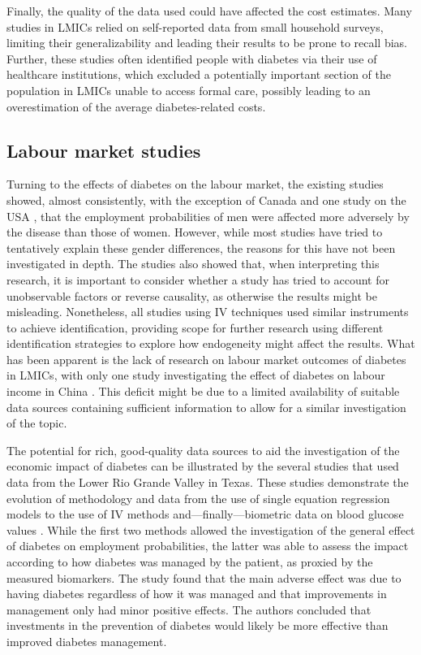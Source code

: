 Finally, the quality of the data used could have affected the cost estimates. Many studies in \acp{LMIC} relied on self-reported data from small household surveys, limiting their generalizability and leading their results to be prone to recall bias. Further, these studies often identified people with diabetes via their use of healthcare institutions, which excluded a potentially important section of the population in \acp{LMIC} unable to access formal care, possibly leading to an overestimation of the average diabetes-related costs. 

\subsection{Labour market studies}
Turning to the effects of diabetes on the labour market, the existing studies showed, almost consistently, with the exception of Canada \parencite{Latif2009} and one study on the USA \parencite{Minor2013}, that the employment probabilities of men were affected more adversely by the disease than those of women. However, while most studies have tried to tentatively explain these gender differences, the reasons for this have not been investigated in depth.  The studies also showed that, when interpreting this research, it is important to consider whether a study has tried to account for unobservable factors or reverse causality, as otherwise the results might be misleading. Nonetheless, all studies using \ac{IV} techniques used similar instruments to achieve identification, providing scope for further research using different identification strategies to explore how endogeneity might affect the results. What has been apparent is the lack of research on labour market outcomes of diabetes in \acp{LMIC}, with only one study investigating the effect of diabetes on labour income in China \parencite{Liu2014}. This deficit might be due to a limited availability of suitable data sources containing sufficient information to allow for a similar investigation of the topic.

The potential for rich, good-quality data sources to aid the investigation of the economic impact of diabetes can be illustrated by the several studies that used data from the Lower Rio Grande Valley in Texas. These studies demonstrate the evolution of methodology and data from the use of single equation regression models \parencite{Bastida2002} to the use of \ac{IV} methods \parencite{Brown2005} and---finally---biometric data on blood glucose values \parencite{BrownIII2011}. While the first two methods allowed the investigation of the general effect of diabetes on employment probabilities, the latter was able to assess the impact according to how diabetes was managed by the patient, as proxied by the measured biomarkers. The study found that the main adverse effect was due to having diabetes regardless of how it was managed and that improvements in management only had minor positive effects. The authors concluded that investments in the prevention of diabetes would likely be more effective than improved diabetes management.

